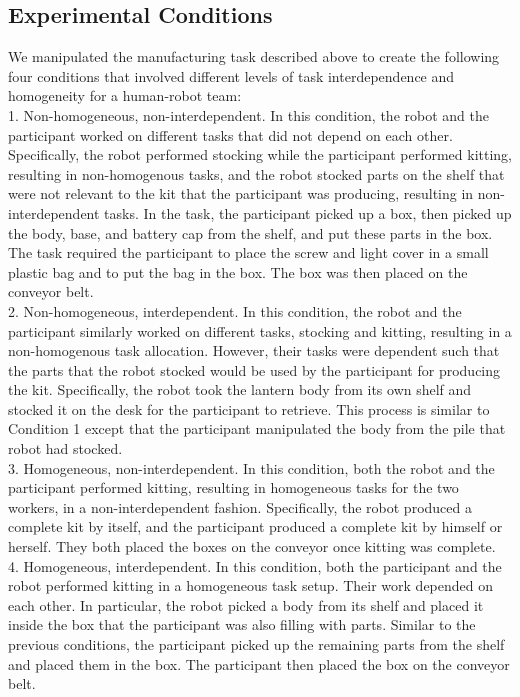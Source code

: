 \subsection{Experimental Conditions}
      We manipulated  the manufacturing task described above to create the following four conditions that involved different levels of task interdependence and homogeneity for a human-robot team:\\
       1. Non-homogeneous, non-interdependent. In this condition, the robot and the participant worked on different tasks that did not depend on each other.  Specifically, the robot performed stocking while the participant performed kitting, resulting in non-homogenous tasks, and the robot stocked parts on the shelf that were not relevant to the kit that the participant was producing, resulting in non-interdependent tasks. In the task, the participant picked up a box, then picked up the body, base, and battery cap from the shelf, and put these parts in the box. The task required the participant to place the screw and light cover in a small plastic bag and to put the bag in the box. The box was then placed on the conveyor belt.\\
       2. Non-homogeneous, interdependent. In this condition, the robot and the participant similarly worked on different tasks, stocking and kitting, resulting in  a non-homogenous task allocation. However, their tasks were dependent such that the parts that the robot stocked would be used by the participant for producing the kit. Specifically, the robot took the lantern body from its own shelf and stocked it on the desk for the participant to retrieve. This process is similar to Condition 1 except that the participant manipulated the body from the pile that robot had stocked.\\
       3. Homogeneous, non-interdependent. In this condition, both the robot and the participant performed kitting, resulting in homogeneous tasks for the two workers, in a non-interdependent fashion. Specifically, the robot produced a complete kit by itself, and the participant produced a complete kit by himself or herself. They both placed the boxes on the conveyor once kitting was complete.\\
       4. Homogeneous, interdependent. In this condition, both the participant and the robot performed kitting in a homogeneous task setup. Their work depended on each other. In particular, the robot picked a body from its shelf and placed it inside the box that the participant was also filling with parts. Similar to the previous conditions, the participant picked up the remaining parts from the shelf and placed them in the box. The participant then placed the box on the conveyor belt.\\
